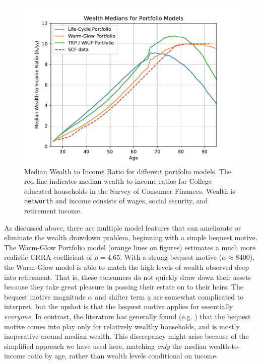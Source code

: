 \documentclass{article}
\newcommand{\CRRA}{\rho}
\begin{document}
\begin{figure}[!htbp]
\centering
\includegraphics[width=0.7\linewidth]{files/median_wealth-9642ec8cf12f2cc1fb7301752a15257b.pdf}
\caption[]{Median Wealth to Income Ratio for different portfolio models. The red line indicates median wealth-to-income ratios for College educated households in the Survey of Consumer Finances. Wealth is \texttt{networth} and income consists of wages, social security, and retirement income.}
\label{medwealth}
\end{figure}

As discussed above, there are multiple model features that can ameliorate or eliminate the wealth drawdown problem, beginning with a simple bequest motive.
The Warm-Glow Portfolio model (orange lines on figures) estimates a much more realistic CRRA coefficient of $\CRRA = 4.65$.
With a strong bequest motive ($\alpha \approx 8400$), the Warm-Glow model is able to match the high levels of wealth observed deep into retirement.
That is, these consumers do not quickly draw down their assets because they take great pleasure in passing their estate on to their heirs.
The bequest motive magnitude $\alpha$ and shifter term $\underline{a}$ are somewhat complicated to interpret, but the upshot is that the bequest motive applies for essentially \textit{everyone}.
In contrast, the literature has generally found (e.g. \cite{deNardiBequest}) that the bequest motive comes into play only for relatively wealthy households, and is mostly inoperative around median wealth.
This discrepancy might arise because of the simplified approach we have used here, matching \textit{only} the median wealth-to-income ratio by age, rather than wealth levels conditional on income.
\end{document}
